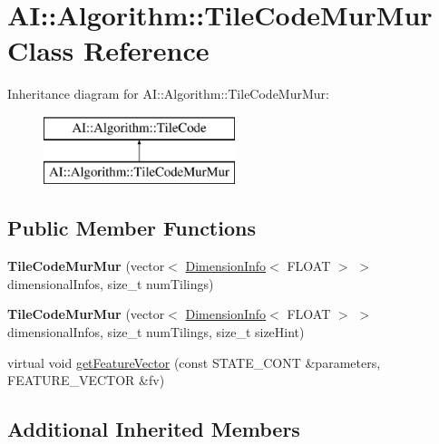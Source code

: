 \hypertarget{classAI_1_1Algorithm_1_1TileCodeMurMur}{\section{A\-I\-:\-:Algorithm\-:\-:Tile\-Code\-Mur\-Mur Class Reference}
\label{classAI_1_1Algorithm_1_1TileCodeMurMur}
}
Inheritance diagram for A\-I\-:\-:Algorithm\-:\-:Tile\-Code\-Mur\-Mur\-:\begin{figure}[H]
\begin{center}
\leavevmode
\includegraphics[height=2.000000cm]{classAI_1_1Algorithm_1_1TileCodeMurMur}
\end{center}
\end{figure}
\subsection*{Public Member Functions}
\begin{DoxyCompactItemize}
\item 
\hypertarget{classAI_1_1Algorithm_1_1TileCodeMurMur_a48746c4faa0e887b4a1fb16aba0cd6d9}{{\bfseries Tile\-Code\-Mur\-Mur} (vector$<$ \hyperlink{classAI_1_1Algorithm_1_1DimensionInfo}{Dimension\-Info}$<$ F\-L\-O\-A\-T $>$ $>$ dimensional\-Infos, size\-\_\-t num\-Tilings)}\label{classAI_1_1Algorithm_1_1TileCodeMurMur_a48746c4faa0e887b4a1fb16aba0cd6d9}

\item 
\hypertarget{classAI_1_1Algorithm_1_1TileCodeMurMur_a55c39ff49b9686a90ed6f823986fe4c3}{{\bfseries Tile\-Code\-Mur\-Mur} (vector$<$ \hyperlink{classAI_1_1Algorithm_1_1DimensionInfo}{Dimension\-Info}$<$ F\-L\-O\-A\-T $>$ $>$ dimensional\-Infos, size\-\_\-t num\-Tilings, size\-\_\-t size\-Hint)}\label{classAI_1_1Algorithm_1_1TileCodeMurMur_a55c39ff49b9686a90ed6f823986fe4c3}

\item 
virtual void \hyperlink{classAI_1_1Algorithm_1_1TileCodeMurMur_abd19bfe7dd3ddace0cec0ad9a8715392}{get\-Feature\-Vector} (const S\-T\-A\-T\-E\-\_\-\-C\-O\-N\-T \&parameters, F\-E\-A\-T\-U\-R\-E\-\_\-\-V\-E\-C\-T\-O\-R \&fv)
\end{DoxyCompactItemize}
\subsection*{Additional Inherited Members}


